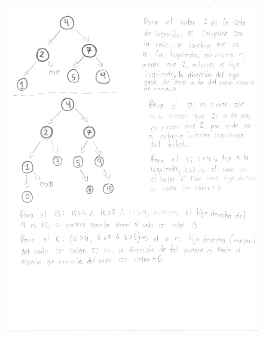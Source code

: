 \documentclass[11pt]{article}
\begin{document}
\newpage
\begin{figure}[H]
\includegraphics[width=18.5cm]{foto2.jpg}
\centering
\end{figure}
\end{document}
